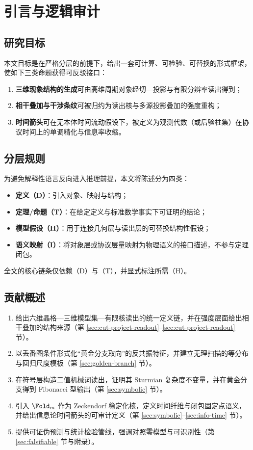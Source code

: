 \section{引言与逻辑审计}

\subsection{研究目标}

本文目标是在严格分层的前提下，给出一套可计算、可检验、可替换的形式框架，使如下三类命题获得可反驳接口：
\begin{enumerate}
  \item \textbf{三维现象结构的生成}可由高维周期对象经切—投影与有限分辨率读出得到；
  \item \textbf{相干叠加与干涉条纹}可被归约为读出核与多源投影叠加的强度重构；
  \item \textbf{时间箭头}可在无本体时间流动假设下，被定义为观测代数（或后验柱集）在协议时间上的单调精化与信息率收缩。
\end{enumerate}

\subsection{分层规则}

为避免解释性语言反向进入推理前提，本文将陈述分为四类：
\begin{itemize}
  \item \textbf{定义（D）}：引入对象、映射与结构；
  \item \textbf{定理/命题（T）}：在给定定义与标准数学事实下可证明的结论；
  \item \textbf{模型假设（H）}：用于连接几何层与读出层的可替换结构性假设；
  \item \textbf{语义映射（I）}：将对象层或协议层量映射为物理语义的接口描述，不参与定理闭包。
\end{itemize}
全文的核心链条仅依赖（D）与（T），并显式标注所需（H）。

\subsection{贡献概述}

\begin{enumerate}
  \item 给出六维晶格—三维模型集—有限核读出的统一定义链，并在强度层面给出相干叠加的结构来源（第 \ref{sec:cut-project-readout}--\ref{sec:cut-project-readout} 节）。
  \item 以丢番图条件形式化“黄金分支取向”的反共振特征，并建立无理扫描的等分布与回归尺度模板（第 \ref{sec:golden-branch} 节）。
  \item 在符号层构造二值机械词读出，证明其 Sturmian 复杂度不变量，并在黄金分支得到 Fibonacci 型输出（第 \ref{sec:symbolic} 节）。
  \item 引入 $\Fold_m$ 作为 Zeckendorf 稳定化核，定义时间纤维与闭包固定点语义，并给出信息论时间箭头的可审计定义（第 \ref{sec:symbolic}--\ref{sec:info-time} 节）。
  \item 提供可证伪预测与统计检验管线，强调对照零模型与可识别性（第 \ref{sec:falsifiable} 节与附录）。
\end{enumerate}

